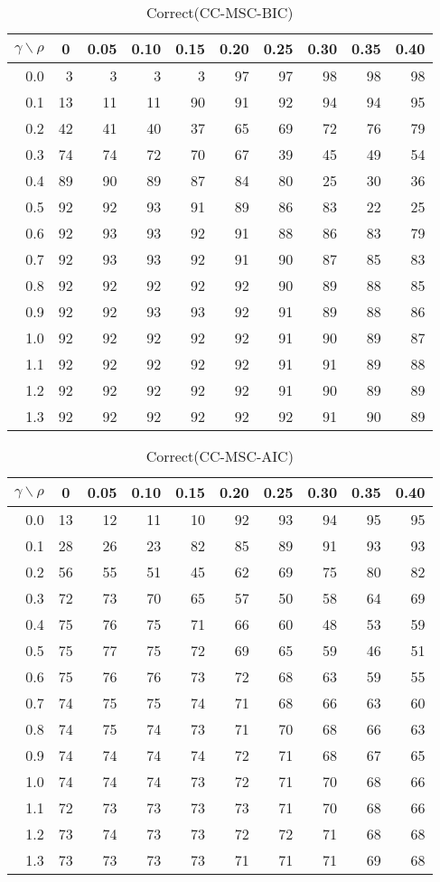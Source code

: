\documentclass[12pt]{article}
\begin{document}
%
\begin{table}[!tbp]
\caption{Correct(CC-MSC-BIC)}
 \begin{center}
 \begin{tabular}{r|rrrrrrrrr}\hline\hline
\multicolumn{1}{c|}{$\gamma\backslash\rho$}&\multicolumn{1}{c}{0}&\multicolumn{1}{c}{0.05}&\multicolumn{1}{c}{0.10}&\multicolumn{1}{c}{0.15}&\multicolumn{1}{c}{0.20}&\multicolumn{1}{c}{0.25}&\multicolumn{1}{c}{0.30}&\multicolumn{1}{c}{0.35}&\multicolumn{1}{c}{0.40}\tabularnewline
\hline

0.0& 3& 3& 3& 3&97&97&98&98&98\tabularnewline
0.1&13&11&11&90&91&92&94&94&95\tabularnewline
0.2&42&41&40&37&65&69&72&76&79\tabularnewline
0.3&74&74&72&70&67&39&45&49&54\tabularnewline
0.4&89&90&89&87&84&80&25&30&36\tabularnewline
0.5&92&92&93&91&89&86&83&22&25\tabularnewline
0.6&92&93&93&92&91&88&86&83&79\tabularnewline
0.7&92&93&93&92&91&90&87&85&83\tabularnewline
0.8&92&92&92&92&92&90&89&88&85\tabularnewline
0.9&92&92&93&93&92&91&89&88&86\tabularnewline
1.0&92&92&92&92&92&91&90&89&87\tabularnewline
1.1&92&92&92&92&92&91&91&89&88\tabularnewline
1.2&92&92&92&92&92&91&90&89&89\tabularnewline
1.3&92&92&92&92&92&92&91&90&89\tabularnewline
\hline
\end{tabular}

\end{center}

\end{table}

%
\begin{table}[!tbp]
\caption{Correct(CC-MSC-AIC)}
 \begin{center}
 \begin{tabular}{r|rrrrrrrrr}\hline\hline
\multicolumn{1}{c|}{$\gamma\backslash\rho$}&\multicolumn{1}{c}{0}&\multicolumn{1}{c}{0.05}&\multicolumn{1}{c}{0.10}&\multicolumn{1}{c}{0.15}&\multicolumn{1}{c}{0.20}&\multicolumn{1}{c}{0.25}&\multicolumn{1}{c}{0.30}&\multicolumn{1}{c}{0.35}&\multicolumn{1}{c}{0.40}\tabularnewline
\hline

0.0&13&12&11&10&92&93&94&95&95\tabularnewline
0.1&28&26&23&82&85&89&91&93&93\tabularnewline
0.2&56&55&51&45&62&69&75&80&82\tabularnewline
0.3&72&73&70&65&57&50&58&64&69\tabularnewline
0.4&75&76&75&71&66&60&48&53&59\tabularnewline
0.5&75&77&75&72&69&65&59&46&51\tabularnewline
0.6&75&76&76&73&72&68&63&59&55\tabularnewline
0.7&74&75&75&74&71&68&66&63&60\tabularnewline
0.8&74&75&74&73&71&70&68&66&63\tabularnewline
0.9&74&74&74&74&72&71&68&67&65\tabularnewline
1.0&74&74&74&73&72&71&70&68&66\tabularnewline
1.1&72&73&73&73&73&71&70&68&66\tabularnewline
1.2&73&74&73&73&72&72&71&68&68\tabularnewline
1.3&73&73&73&73&71&71&71&69&68\tabularnewline
\hline
\end{tabular}

\end{center}

\end{table}
\end{document}
